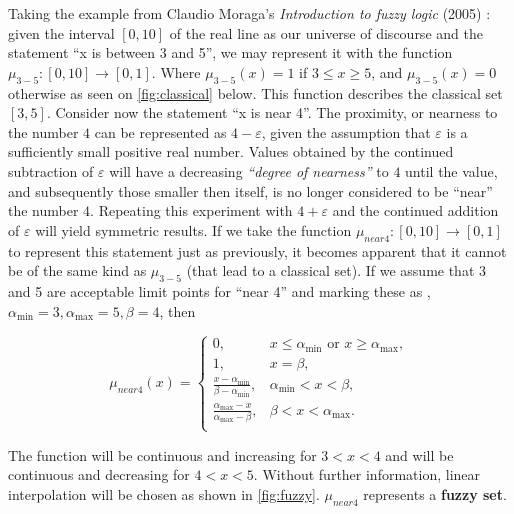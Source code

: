 Taking the example from Claudio Moraga's \textit{Introduction to fuzzy logic} (2005) \cite{moraga2005}: given the interval $[0, 10]$ of the real line as our universe of discourse and the statement ``x is between 3 and 5'', we may represent it with the function $\mu_{3-5}:[0, 10] \to [0,1]$. Where $\mu_{3-5}(x) = 1$ if $3 \leq x \geq 5$, and $\mu_{3-5}(x) = 0$ otherwise as seen on \ref{fig:classical} below. This function describes the classical set $[3, 5]$. Consider now the statement ``x is near 4''. The proximity, or nearness to the number $4$ can be represented as $4-\varepsilon$, given the assumption that $\varepsilon$ is a sufficiently small positive real number. Values obtained by the continued subtraction of $\varepsilon$ will have a decreasing \textit{``degree of nearness''} to $4$ until the value, and subsequently those smaller then itself, is no longer considered to be ``near'' the number $4$. Repeating this experiment with $4+\varepsilon$ and the continued addition of $\varepsilon$ will yield symmetric results. If we take the function $\mu_{near 4} : [0, 10] \to [0, 1]$ to represent this statement just as previously, it becomes apparent that it cannot be of the same kind as $\mu_{3-5}$ (that lead to a classical set). If we assume that 3 and 5 are acceptable limit points for ``near 4” and marking these as , $\alpha_{\min} = 3, \alpha_{\max} = 5, \beta = 4$, then

\[
	\mu_{near 4}(x) =
		\begin{cases}
			0, &x \leq \alpha_{\min} \text{ or } x \geq \alpha_{\max},\\
			1, &x = \beta,\\
			\frac{x - \alpha_{\min}}{\beta - \alpha_{\min}}, &\alpha_{\min} < x < \beta,\\
			\frac{\alpha_{\max} - x}{\alpha_{\max} - \beta}, &\beta < x < \alpha_{\max}.\\
		\end{cases}
\]

The function will be continuous and increasing for $3 < x < 4$ and will be continuous and decreasing for $ 4 < x < 5$. Without further information, linear interpolation will be chosen as shown in \ref{fig:fuzzy}. $\mu_{near 4} $ represents a \textbf{fuzzy set}.

